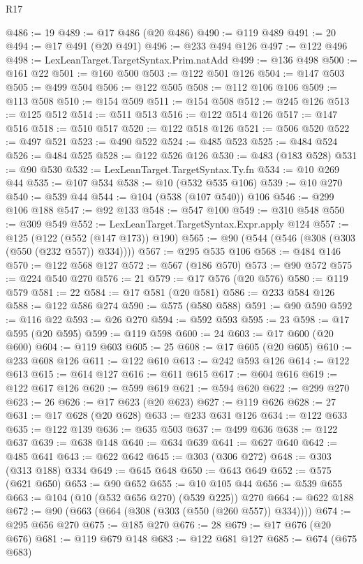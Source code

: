 \begin{lexlean}{R17}
\begin{coremodule}
@486 := 19
@489 := @17 @486 (@20 @486)
@490 := @119 @489
@491 := 20
@494 := @17 @491 (@20 @491)
@496 := @233 @494 @126
@497 := @122 @496
@498 := LexLeanTarget.TargetSyntax.Prim.natAdd
@499 := @136 @498
@500 := @161 @22
@501 := @160 @500
@503 := @122 @501 @126
@504 := @147 @503
@505 := @499 @504
@506 := @122 @505
@508 := @112 @106 @106
@509 := @113 @508
@510 := @154 @509
@511 := @154 @508
@512 := @245 @126
@513 := @125 @512
@514 := @511 @513
@516 := @122 @514 @126
@517 := @147 @516
@518 := @510 @517
@520 := @122 @518 @126
@521 := @506 @520
@522 := @497 @521
@523 := @490 @522
@524 := @485 @523
@525 := @484 @524
@526 := @484 @525
@528 := @122 @526 @126
@530 := @483 (@183 @528)
@531 := @90 @530
@532 := LexLeanTarget.TargetSyntax.Ty.fn
@534 := @10 @269 @44
@535 := @107 @534
@538 := @10 (@532 @535 @106)
@539 := @10 @270
@540 := @539 @44
@544 := @104 (@538 (@107 @540)) @106
@546 := @299 @106 @188
@547 := @92 @133
@548 := @547 @100
@549 := @310 @548
@550 := @309 @549
@552 := LexLeanTarget.TargetSyntax.Expr.apply @124
@557 := @125 (@122 (@552 (@147 @173)) @190)
@565 := @90 (@544 (@546 (@308 (@303 (@550 (@232 @557)) @334))))
@567 := @295 @535 @106
@568 := @484 @146
@570 := @122 @568 @127
@572 := @567 (@186 @570)
@573 := @90 @572
@575 := @224 @540 @270
@576 := 21
@579 := @17 @576 (@20 @576)
@580 := @119 @579
@581 := 22
@584 := @17 @581 (@20 @581)
@586 := @233 @584 @126
@588 := @122 @586 @274
@590 := @575 (@580 @588)
@591 := @90 @590
@592 := @116 @22
@593 := @26 @270
@594 := @592 @593
@595 := 23
@598 := @17 @595 (@20 @595)
@599 := @119 @598
@600 := 24
@603 := @17 @600 (@20 @600)
@604 := @119 @603
@605 := 25
@608 := @17 @605 (@20 @605)
@610 := @233 @608 @126
@611 := @122 @610
@613 := @242 @593 @126
@614 := @122 @613
@615 := @614 @127
@616 := @611 @615
@617 := @604 @616
@619 := @122 @617 @126
@620 := @599 @619
@621 := @594 @620
@622 := @299 @270
@623 := 26
@626 := @17 @623 (@20 @623)
@627 := @119 @626
@628 := 27
@631 := @17 @628 (@20 @628)
@633 := @233 @631 @126
@634 := @122 @633
@635 := @122 @139
@636 := @635 @503
@637 := @499 @636
@638 := @122 @637
@639 := @638 @148
@640 := @634 @639
@641 := @627 @640
@642 := @485 @641
@643 := @622 @642
@645 := @303 (@306 @272)
@648 := @303 (@313 @188) @334
@649 := @645 @648
@650 := @643 @649
@652 := @575 (@621 @650)
@653 := @90 @652
@655 := @10 @105 @44
@656 := @539 @655
@663 := @104 (@10 (@532 @656 @270) (@539 @225)) @270
@664 := @622 @188
@672 := @90 (@663 (@664 (@308 (@303 (@550 (@260 @557)) @334))))
@674 := @295 @656 @270
@675 := @185 @270
@676 := 28
@679 := @17 @676 (@20 @676)
@681 := @119 @679 @148
@683 := @122 @681 @127
@685 := @674 (@675 @683)

\end{coremodule}
\end{lexlean}
